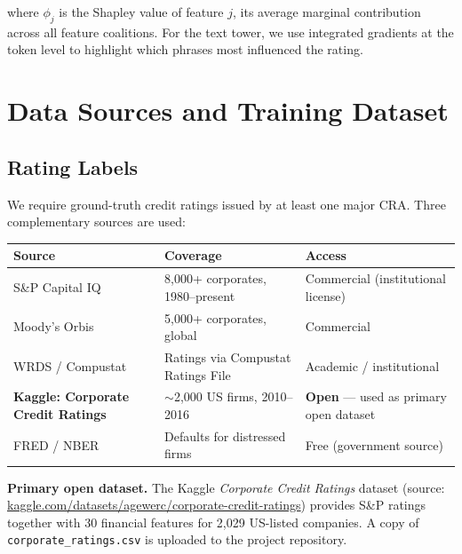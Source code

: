 \documentclass[12pt, a4paper]{article}
\begin{document}
where $\phi_j$ is the Shapley value of feature $j$, its average marginal contribution across all feature coalitions.  For the text tower, we use integrated gradients at the token level to highlight which phrases most influenced the rating.

\newpage

\section{Data Sources and Training Dataset}
\label{sec:data}

\subsection{Rating Labels}

We require ground-truth credit ratings issued by at least one major CRA.  Three complementary sources are used:

\begin{center}
\begin{tabularx}{\linewidth}{l l X}
  \toprule
  \textbf{Source} & \textbf{Coverage} & \textbf{Access} \\
  \midrule
  S\&P Capital IQ & 8,000+ corporates, 1980–present & Commercial (institutional license) \\
  Moody's Orbis & 5,000+ corporates, global & Commercial \\
  WRDS / Compustat & Ratings via Compustat Ratings File & Academic / institutional \\
  \textbf{Kaggle: Corporate Credit Ratings} & $\sim$2,000 US firms, 2010–2016 & \textbf{Open} — used as primary open dataset \\
  FRED / NBER & Defaults for distressed firms & Free (government source) \\
  \bottomrule
\end{tabularx}
\end{center}

\begin{keyinsight}
\textbf{Primary open dataset.}  The Kaggle \textit{Corporate Credit Ratings} dataset (source: \href{https://www.kaggle.com/datasets/agewerc/corporate-credit-ratings}{kaggle.com/datasets/agewerc/corporate-credit-ratings}) provides S\&P ratings together with 30 financial features for 2,029 US-listed companies. A copy of \texttt{corporate\_ratings.csv} is uploaded to the project repository.
\end{keyinsight}
\end{document}
